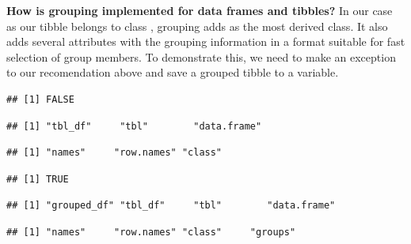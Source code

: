 \documentclass[krantz2]{krantz}\usepackage{knitr}%
\begin{document}
\begin{warningbox}
\textbf{How is grouping implemented for data frames and tibbles?} In our case as our tibble belongs to class , grouping adds  as the most derived class. It also adds several attributes with the grouping information in a format suitable for fast selection of group members. To demonstrate this, we need to make an exception to our recomendation above and save a grouped tibble to a variable.

\begin{knitrout}\footnotesize
{}\color{fgcolor}\begin{kframe}
\begin{alltt}
 \hlkwb{<-} \hlstd{(} \hlstd{=} \hlopt{:}\hlstd{,}  \hlstd{=} \hlstd{(letters[}\hlopt{:}\hlstd{],} \hlstd{))}
\end{alltt}
\begin{verbatim}
## [1] FALSE
\end{verbatim}
\begin{alltt}
\end{alltt}
\begin{verbatim}
## [1] "tbl_df"     "tbl"        "data.frame"
\end{verbatim}
\begin{alltt}
\hlstd{(}
\end{alltt}
\begin{verbatim}
## [1] "names"     "row.names" "class"
\end{verbatim}
\end{kframe}
\end{knitrout}

\begin{knitrout}\footnotesize
{}\color{fgcolor}\begin{kframe}
\begin{alltt}
 \hlkwb{<-} \hlstd{(} 
\end{alltt}
\begin{verbatim}
## [1] TRUE
\end{verbatim}
\begin{alltt}
\end{alltt}
\begin{verbatim}
## [1] "grouped_df" "tbl_df"     "tbl"        "data.frame"
\end{verbatim}
\begin{alltt}
\hlstd{(}
\end{alltt}
\begin{verbatim}
## [1] "names"     "row.names" "class"     "groups"
\end{verbatim}
\end{kframe}
\end{knitrout}


\end{warningbox}
\end{document}
